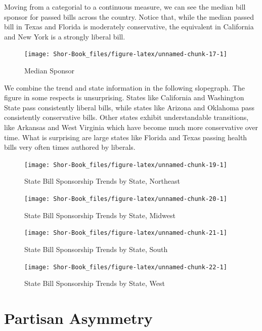 \documentclass[
  oneside]{book}
\begin{document}
Moving from a categorial to a continuous measure, we can see the median bill sponsor for passed bills across the country. Notice that, while the median passed bill in Texas and Florida is moderately conservative, the equivalent in California and New York is a strongly liberal bill.

\begin{figure}
\texttt{[image: Shor-Book\_files/figure-latex/unnamed-chunk-17-1]} \caption{Median Sponsor}\label{fig:unnamed-chunk-17}
\end{figure}

We combine the trend and state information in the following slopegraph. The figure in some respects is unsurprising. States like California and Washington State pass consistently liberal bills, while states like Arizona and Oklahoma pass consistently conservative bills. Other states exhibit understandable transitions, like Arkansas and West Virginia which have become much more conservative over time. What is surprising are large states like Florida and Texas passing health bills very often times authored by liberals.

\begin{figure}
\texttt{[image: Shor-Book\_files/figure-latex/unnamed-chunk-19-1]} \caption{State Bill Sponsorship Trends by State, Northeast}\label{fig:unnamed-chunk-19}
\end{figure}
\begin{figure}
\texttt{[image: Shor-Book\_files/figure-latex/unnamed-chunk-20-1]} \caption{State Bill Sponsorship Trends by State, Midwest}\label{fig:unnamed-chunk-20}
\end{figure}

\begin{figure}
\texttt{[image: Shor-Book\_files/figure-latex/unnamed-chunk-21-1]} \caption{State Bill Sponsorship Trends by State, South}\label{fig:unnamed-chunk-21}
\end{figure}

\begin{figure}
\texttt{[image: Shor-Book\_files/figure-latex/unnamed-chunk-22-1]} \caption{State Bill Sponsorship Trends by State, West}\label{fig:unnamed-chunk-22}
\end{figure}

\hypertarget{partisan-asymmetry}{%
\section{Partisan Asymmetry}\label{partisan-asymmetry}}
\end{document}
